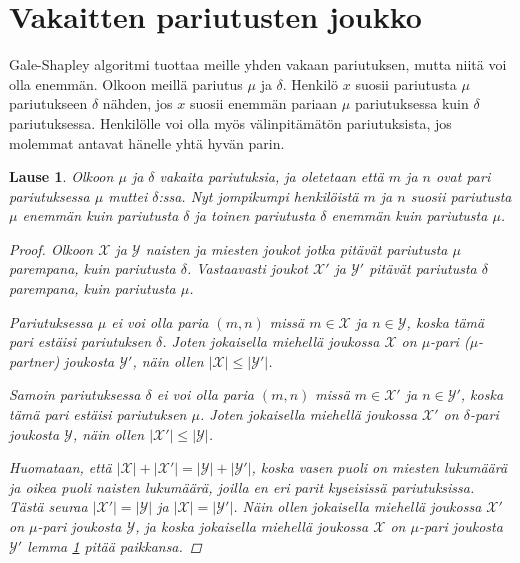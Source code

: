 \documentclass[finnish]{tktltiki2}
\newtheorem{lau}{Lause}
\theoremstyle{definition}
\theoremstyle{remark}
\begin{document}
\section{Vakaitten pariutusten joukko}
Gale-Shapley algoritmi tuottaa meille yhden vakaan pariutuksen, mutta niitä voi olla enemmän.
Olkoon meillä pariutus $\mu$ ja $\delta$. Henkilö $x$ suosii pariutusta $\mu$ pariutukseen $\delta$ nähden, jos $x$ suosii enemmän pariaan $\mu$ pariutuksessa kuin $\delta$ pariutuksessa. Henkilölle voi olla myös välinpitämätön pariutuksista, jos molemmat antavat hänelle yhtä hyvän parin.

\begin{lau} \cite[p. 18]{gusfield1989stable}\label{lause-guspref}
	Olkoon $\mu$ ja $\delta$ vakaita pariutuksia, ja oletetaan että $m$ ja $n$ ovat pari pariutuksessa $\mu$ muttei $\delta$:ssa. Nyt jompikumpi henkilöistä $m$ ja $n$ suosii pariutusta $\mu$ enemmän kuin pariutusta $\delta$ ja toinen pariutusta $\delta$ enemmän kuin pariutusta $\mu$.
\begin{proof} \cite[s. 18]{gusfield1989stable}
Olkoon $\mathcal{X}$ ja $\mathcal{Y}$ naisten ja miesten joukot jotka pitävät pariutusta $\mu$ parempana, kuin pariutusta $\delta$. Vastaavasti joukot $\mathcal{X}'$ ja $\mathcal{Y}'$ pitävät pariutusta $\delta$ parempana, kuin pariutusta $\mu$.

Pariutuksessa $\mu$ ei voi olla paria $(m, n)$ missä $m \in \mathcal{X}$ ja $n \in \mathcal{Y}$, koska tämä pari estäisi pariutuksen $\delta$. Joten jokaisella miehellä joukossa $\mathcal{X}$ on $\mu$-pari (\emph{$\mu$-partner}) joukosta $\mathcal{Y'}$, näin ollen $|\mathcal{X}| \leq |\mathcal{Y'}|$.

Samoin pariutuksessa $\delta$ ei voi olla paria $(m, n)$ missä $m \in \mathcal{X}'$ ja $n \in \mathcal{Y}'$, koska tämä pari estäisi pariutuksen $\mu$. Joten jokaisella miehellä joukossa $\mathcal{X}'$ on $\delta$-pari joukosta $\mathcal{Y}$, näin ollen $|\mathcal{X}'| \leq |\mathcal{Y}|$.

Huomataan, että $|\mathcal{X}| + |\mathcal{X}'| = |\mathcal{Y}| + |\mathcal{Y}'|$, koska vasen puoli on miesten lukumäärä ja oikea puoli naisten lukumäärä, joilla en eri parit kyseisissä pariutuksissa. Tästä seuraa $|\mathcal{X}'| = |\mathcal{Y}|$ ja $|\mathcal{X}| = |\mathcal{Y}'|$. Näin ollen jokaisella miehellä joukossa $\mathcal{X}'$ on $\mu$-pari joukosta $\mathcal{Y}$, ja koska jokaisella miehellä joukossa $\mathcal{X}$ on $\mu$-pari joukosta $\mathcal{Y}'$ lemma \ref{lause-guspref} pitää paikkansa.
\end{proof}
\end{lau}
\end{document}
